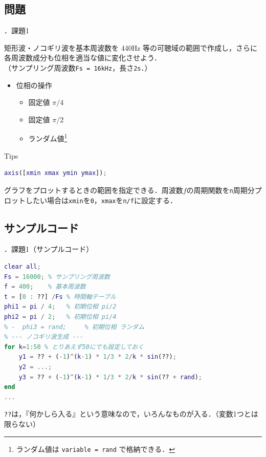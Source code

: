 \documentclass[aspectratio=43]{beamer}
\newcommand{\showsec}{\thesection ．}
\begin{document}
\subsection{問題}
\begin{frame}[t,containsverbatim]{\showsec 課題1}
    \begin{exampleblock}{}
        矩形波・ノコギリ波を基本周波数を 440Hz 等の可聴域の範囲で作成し，さらに各周波数成分も位相を適当な値に変化させよう．\\
        （サンプリング周波数\verb|Fs = 16kHz|，長さ\verb|2s|．）
        \begin{itemize}
            \item 位相の操作
                  \begin{itemize}
                      \item 固定値 \(\pi/4\)
                      \item 固定値 \(\pi/2\)
                      \item ランダム値\footnote{ランダム値は \texttt{variable = rand} で格納できる．}
                  \end{itemize}
        \end{itemize}
    \end{exampleblock}
    \begin{block}{Tips}
        \begin{lstlisting}[language={Matlab},numbers={none},frame={none},xleftmargin=0em]
axis([xmin xmax ymin ymax]);
        \end{lstlisting}
        グラフをプロットするときの範囲を指定できる．周波数\(f\)の周期関数を\texttt{n}周期分プロットしたい場合は\texttt{xmin}を\texttt{0}，\texttt{xmax}を\texttt{n/f}に設定する．
    \end{block}
\end{frame}
\subsection{サンプルコード}
\begin{frame}[t,containsverbatim]{\showsec 課題1（サンプルコード）}
    \begin{lstlisting}[language={Matlab}]
clear all;
Fs = 16000; % サンプリング周波数
f = 400;    % 基本周波数
t = [0 : ??] /Fs % 時間軸テーブル
phi1 = pi / 4;   % 初期位相 pi/2
phi2 = pi / 2;   % 初期位相 pi/4
% -  phi3 = rand;     % 初期位相 ランダム
% --- ノコギリ波生成 ---
for k=1:50 % とりあえず50にでも設定しておく
    y1 = ?? + (-1)^(k-1) * 1/3 * 2/k * sin(??);
    y2 = ...;
    y3 = ?? + (-1)^(k-1) * 1/3 * 2/k * sin(?? + rand);
end
...
\end{lstlisting}
    \begin{block}{}
        \texttt{??}は，『何かしら入る』という意味なので，いろんなものが入る．（変数1つとは限らない）
    \end{block}
\end{frame}
\end{document}
